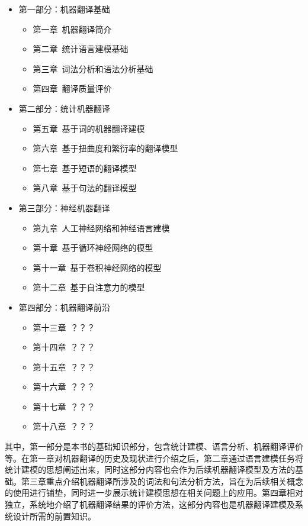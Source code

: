 \begin{spacing}{1.18}
\begin{itemize}
\vspace{0.5em}
\item 第一部分：机器翻译基础
    \begin{itemize}
    \item 第一章\ 机器翻译简介
    \item 第二章\ 统计语言建模基础
    \item 第三章\ 词法分析和语法分析基础
    \item 第四章\ 翻译质量评价
    \end{itemize}
\vspace{0.5em}
\item 第二部分：统计机器翻译
    \begin{itemize}
    \item 第五章\ 基于词的机器翻译建模
    \item 第六章\ 基于扭曲度和繁衍率的翻译模型
    \item 第七章\ 基于短语的翻译模型
    \item 第八章\ 基于句法的翻译模型
    \end{itemize}
\vspace{0.5em}
\item 第三部分：神经机器翻译
    \begin{itemize}
    \item 第九章\ 人工神经网络和神经语言建模
    \item 第十章\ 基于循环神经网络的模型
    \item 第十一章\ 基于卷积神经网络的模型
    \item 第十二章\ 基于自注意力的模型
    \end{itemize}
\vspace{0.5em}
\item 第四部分：机器翻译前沿
    \begin{itemize}
    \item 第十三章\ ？？？
    \item 第十四章\ ？？？
    \item 第十五章\ ？？？
    \item 第十六章\ ？？？
    \item 第十七章\ ？？？
    \item 第十八章\ ？？？
    \end{itemize}
\end{itemize}

\vspace{0.5em}

其中，第一部分是本书的基础知识部分，包含统计建模、语言分析、机器翻译评价等。在第一章对机器翻译的历史及现状进行介绍之后，第二章通过语言建模任务将统计建模的思想阐述出来，同时这部分内容也会作为后续机器翻译模型及方法的基础。第三章重点介绍机器翻译所涉及的词法和句法分析方法，旨在为后续相关概念的使用进行铺垫，同时进一步展示统计建模思想在相关问题上的应用。第四章相对独立，系统地介绍了机器翻译结果的评价方法，这部分内容也是机器翻译建模及系统设计所需的前置知识。


\end{spacing}

